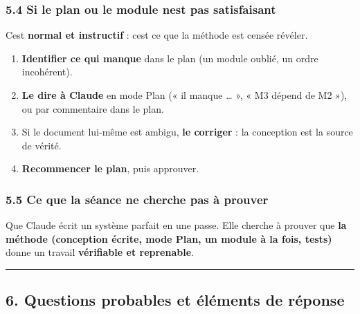 \documentclass[
  french,
  11pt,
  a4paper,
]{article}
\providecommand{\tightlist}{%
  \setlength{\itemsep}{0pt}\setlength{\parskip}{0pt}}
\begin{document}
\subsubsection{5.4 Si le plan ou le module n\textquotesingle est pas
satisfaisant}\label{54-si-le-plan-ou-le-module-nest-pas-satisfaisant}

C\textquotesingle est \textbf{normal et instructif} :
c\textquotesingle est ce que la méthode est censée révéler.

\begin{enumerate}
\def\labelenumi{\arabic{enumi}.}
\tightlist
\item
  \textbf{Identifier ce qui manque} dans le plan (un module oublié, un
  ordre incohérent).
\item
  \textbf{Le dire à Claude} en mode Plan (« il manque \ldots{} », « M3
  dépend de M2 »), ou par commentaire dans le plan.
\item
  Si le document lui-même est ambigu, \textbf{le corriger} : la
  conception est la source de vérité.
\item
  \textbf{Recommencer le plan}, puis approuver.
\end{enumerate}

\subsubsection{5.5 Ce que la séance ne cherche pas à
prouver}\label{55-ce-que-la-suxe9ance-ne-cherche-pas-uxe0-prouver}

Que Claude écrit un système parfait en une passe. Elle cherche à prouver
que \textbf{la méthode (conception écrite, mode Plan, un module à la
fois, tests)} donne un travail \textbf{vérifiable et reprenable}.

\begin{center}\rule{0.5\linewidth}{0.5pt}\end{center}

\subsection{6. Questions probables et éléments de
réponse}\label{6-questions-probables-et-uxe9luxe9ments-de-ruxe9ponse}
\end{document}
